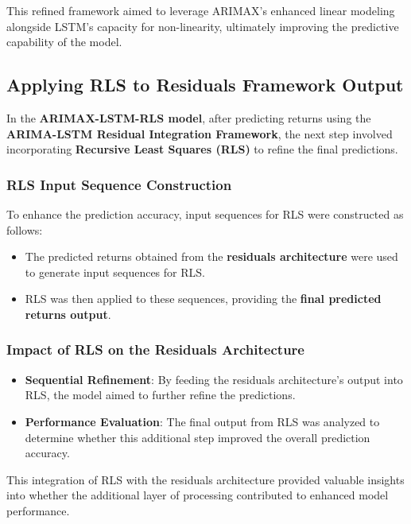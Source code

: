 This refined framework aimed to leverage ARIMAX's enhanced linear modeling alongside LSTM's capacity for non-linearity, ultimately improving the predictive capability of the model.

\subsection{Applying RLS to Residuals Framework Output}

In the \textbf{ARIMAX-LSTM-RLS model}, after predicting returns using the \textbf{ARIMA-LSTM Residual Integration Framework}, the next step involved incorporating \textbf{Recursive Least Squares (RLS)} to refine the final predictions.

\subsubsection{RLS Input Sequence Construction}

To enhance the prediction accuracy, input sequences for RLS were constructed as follows:
\begin{itemize}
    \item The predicted returns obtained from the \textbf{residuals architecture} were used to generate input sequences for RLS.
    \item RLS was then applied to these sequences, providing the \textbf{final predicted returns output}.
\end{itemize}

\subsubsection{Impact of RLS on the Residuals Architecture}

\begin{itemize}
    \item \textbf{Sequential Refinement}: By feeding the residuals architecture's output into RLS, the model aimed to further refine the predictions.
    \item \textbf{Performance Evaluation}: The final output from RLS was analyzed to determine whether this additional step improved the overall prediction accuracy.
\end{itemize}

This integration of RLS with the residuals architecture provided valuable insights into whether the additional layer of processing contributed to enhanced model performance.


